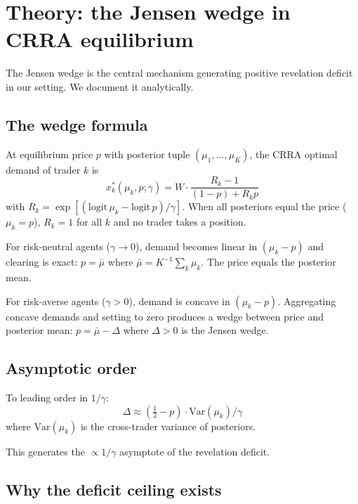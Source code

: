 \documentclass[11pt]{article}
\newcommand{\1}{\mathbf{1}}
\begin{document}
\section{Theory: the Jensen wedge in CRRA equilibrium}
\label{app:jensen}

The Jensen wedge is the central mechanism generating positive
revelation deficit in our setting.  We document it analytically.

\subsection{The wedge formula}

At equilibrium price $p$ with posterior tuple $(\mu_1, \ldots, \mu_K)$,
the CRRA optimal demand of trader $k$ is
\begin{equation}
x_k^*(\mu_k, p; \gamma) = W \cdot \frac{R_k - 1}{(1-p) + R_k p}
\end{equation}
with $R_k = \exp[(\mathrm{logit}\,\mu_k - \mathrm{logit}\,p)/\gamma]$.  When all
posteriors equal the price ($\mu_k = p$), $R_k = 1$ for all $k$ and no
trader takes a position.

For risk-neutral agents ($\gamma \to 0$), demand becomes linear in
$(\mu_k - p)$ and clearing is exact: $p = \bar \mu$ where $\bar \mu
= K^{-1} \sum_k \mu_k$.  The price equals the posterior mean.

For risk-averse agents ($\gamma > 0$), demand is concave in
$(\mu_k - p)$.  Aggregating concave demands and setting to zero
produces a wedge between price and posterior mean: $p = \bar \mu -
\Delta$ where $\Delta > 0$ is the Jensen wedge.

\subsection{Asymptotic order}

To leading order in $1/\gamma$:
\begin{equation}
\Delta \approx (\tfrac12 - p) \cdot \mathrm{Var}(\mu_k) / \gamma
\end{equation}
where $\mathrm{Var}(\mu_k)$ is the cross-trader variance of posteriors.

This generates the $\propto 1/\gamma$ asymptote of the revelation deficit.

\subsection{Why the deficit ceiling exists}
\end{document}
